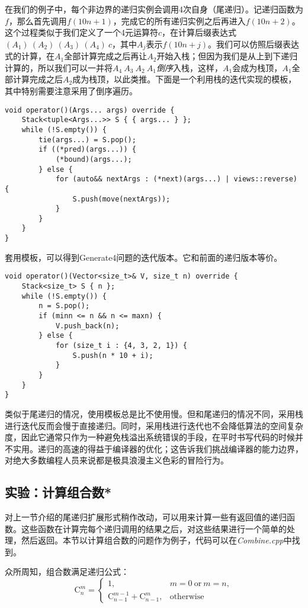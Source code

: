 在我们的例子中，每个非边界的递归实例会调用4次自身（尾递归）。记递归函数为$f$，那么首先调用$f(10n+1)$，完成它的所有递归实例之后再进入$f(10n+2)$。这个过程类似于我们定义了一个4元运算符$c$，在计算后缀表达式$(A_1)\ (A_2)\ (A_3)\ (A_4)\ c$，其中$A_j$表示$f(10n+j)$。我们可以仿照后缀表达式的计算，在$A_1$全部计算完成之后再让$A_2$开始入栈；但因为我们是从上到下递归计算的，所以我们可以一并将$A_4\ A_3\ A_2\ A_1$\textit{倒序}入栈，这样，$A_1$会成为栈顶，$A_1$全部计算完成之后$A_2$成为栈顶，以此类推。下面是一个利用栈的迭代实现的模板，其中特别需要注意采用了倒序遍历。

\begin{lstlisting}
void operator()(Args... args) override {
    Stack<tuple<Args...>> S { { args... } };
    while (!S.empty()) {
        tie(args...) = S.pop();
        if ((*pred)(args...)) {
            (*bound)(args...);
        } else {
            for (auto&& nextArgs : (*next)(args...) | views::reverse) {
                S.push(move(nextArgs));
            }
        }
    }
}
\end{lstlisting}

套用模板，可以得到Generate4问题的迭代版本。它和前面的递归版本等价。

\begin{lstlisting}
void operator()(Vector<size_t>& V, size_t n) override {
    Stack<size_t> S { n };
    while (!S.empty()) {
        n = S.pop();
        if (minn <= n && n <= maxn) {
            V.push_back(n);
        } else {
            for (size_t i : {4, 3, 2, 1}) {
                S.push(n * 10 + i);
            }
        }
    }
}
\end{lstlisting}

类似于尾递归的情况，使用模板总是比不使用慢。但和尾递归的情况不同，采用栈进行迭代反而会慢于直接递归。同时，采用栈进行迭代也不会降低算法的空间复杂度，因此它通常只作为一种避免栈溢出系统错误的手段，在平时书写代码的时候并不实用。递归的高速的得益于编译器的优化；这告诉我们挑战编译器的能力边界，对绝大多数编程人员来说都是极具浪漫主义色彩的冒险行为。

\subsection{实验：计算组合数*}
\label{sta:计算组合数}
对上一节介绍的尾递归扩展形式稍作改动，可以用来计算一些有返回值的递归函数。这些函数在计算完每个递归调用的结果之后，对这些结果进行一个简单的处理，然后返回。本节以计算组合数的问题作为例子，代码可以在\textit{Combine.cpp}中找到。

众所周知，组合数满足递归公式：
$$
\mathrm{C}_n^m = \begin{cases}
    1,&m=0\mathrm{\ or\ }m=n,\\
    \mathrm{C}_{n-1}^{m-1}+\mathrm{C}_{n-1}^m,&\mathrm{otherwise}
\end{cases}
$$


